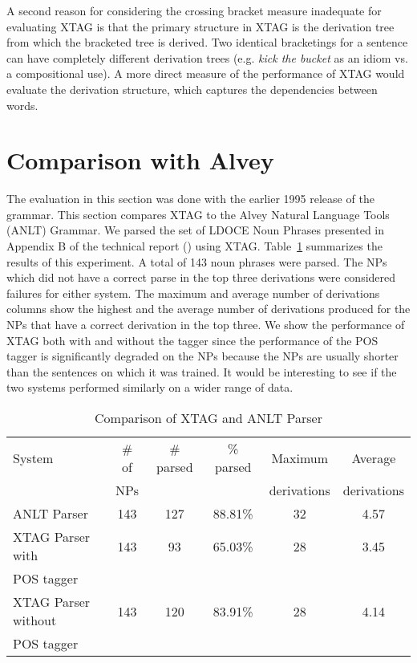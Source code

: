 A second reason for considering the crossing bracket measure
inadequate for evaluating XTAG is that the primary structure in XTAG
is the derivation tree from which the bracketed tree is derived. Two
identical bracketings for a sentence can have completely different
derivation trees (e.g. {\it kick the bucket} as an idiom vs. a
compositional use). A more direct measure of the performance of XTAG
would evaluate the derivation structure, which captures the
dependencies between words.

\section{Comparison with Alvey}

The evaluation in this section was done with the earlier 1995 release
of the grammar. This section compares XTAG to the Alvey Natural
Language Tools (ANLT) Grammar. We parsed the set of LDOCE Noun Phrases
presented in Appendix B of the technical report (\cite{Carroll93})
using XTAG.  Table~\ref{Alvey-xtag} summarizes the results of this
experiment.  A total of 143 noun phrases were parsed. The NPs which
did not have a correct parse in the top three derivations were
considered failures for either system. The maximum and average number
of derivations columns show the highest and the average number of
derivations produced for the NPs that have a correct derivation in the
top three.  We show the performance of XTAG both with and without the
tagger since the performance of the POS tagger is significantly
degraded on the NPs because the NPs are usually shorter than the
sentences on which it was trained. It would be interesting to see if
the two systems performed similarly on a wider range of data.

\begin{table}[ht]
\centering
\begin{tabular}{|l|c|c|c|c|c|}  \hline
System & \# of & \# parsed & \% parsed & Maximum & Average \\
& NPs &&& derivations & derivations \\ \hline
ANLT Parser & 143 & 127 & 88.81\% & 32 & 4.57 \\ \hline
XTAG Parser with & 143 & 93 & 65.03\% & 28 & 3.45 \\
POS tagger & & & & & \\ \hline
XTAG Parser without & 143 & 120 & 83.91\% & 28 & 4.14\\
POS tagger & & & & & \\ \hline
\end{tabular} \\

\vspace{0.1in}

\caption{Comparison of XTAG and ANLT Parser}
\label{Alvey-xtag}
\end{table}

